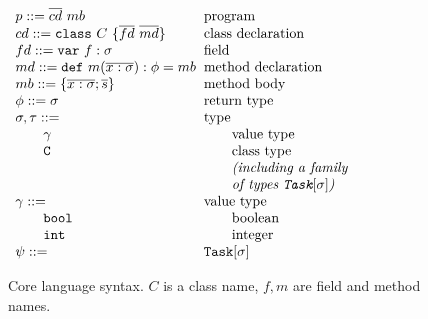 \documentclass{acm_proc_article-sp}
\newcommand{\gap}{\quad\quad}
\newcommand{\ba}{\begin{array}}
\newcommand{\ea}{\end{array}}
\newcommand{\seq}[1]{\overline{#1}}
\begin{document}
\begin{figure}
  \centering
$\ba[t]{l@{\hspace{2mm}}l}
p    ::=  \seq{cd}~mb                                & \mbox{program}             \\
cd   ::=  \texttt{class}~C~\{\seq{fd}~\seq{md}\}     & \mbox{class declaration}   \\
fd   ::=  \texttt{var}~f: \sigma                     & \mbox{field}               \\
md   ::=  \texttt{def}~m(\seq{x: \sigma}): \phi = mb & \mbox{method declaration}  \\
mb   ::=  \{\seq{x: \sigma};\seq{s}\}                & \mbox{method body}         \\
\phi ::=  \sigma                                     & \mbox{return type}         \\
\sigma,\tau ::=                                      & \mbox{type}                \\
\gap \gamma                                          & \gap\mbox{value type}      \\
\gap \texttt{C}                                      & \gap\mbox{class type}      \\
                                                     & \gap\mbox{\em{(including a family}} \\
                                                     & \gap\mbox{\em{of types \texttt{Task}$[\sigma]$)}} \\
\gamma ::=                                           & \mbox{value type} \\
\gap \texttt{bool}                                   & \gap\mbox{boolean}         \\
\gap \texttt{int}                                    & \gap\mbox{integer}         \\
\psi ::=                                             & \mbox{\texttt{Task$[\sigma]$}}         \\
\ea$
  \caption{Core language syntax. $C$ is a class name, $f,m$ are field and
    method names.}
  \label{fig:lang-syntax}
\end{figure}
\end{document}
